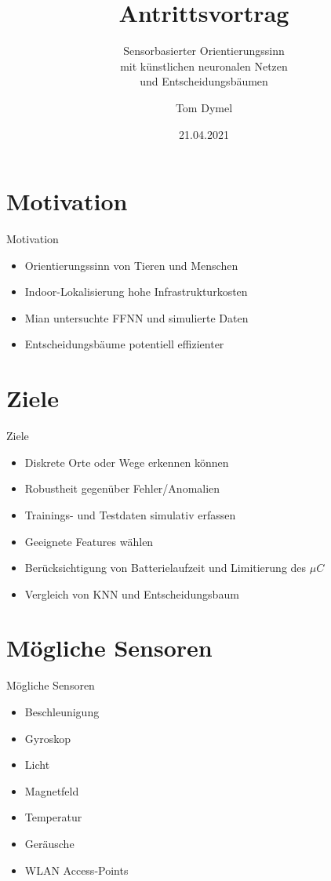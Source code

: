 \documentclass[10pt]{beamer}
\title{Antrittsvortrag}
\subtitle{Sensorbasierter Orientierungssinn\\mit künstlichen neuronalen Netzen\\und Entscheidungsbäumen}
\date{21.04.2021}
\author{Tom Dymel}
\institute{Masterarbeit\\Technische Universität Hamburg}
\begin{document}
\maketitle

\section{Motivation}
\begin{frame}{Motivation}
\begin{itemize}
    \item Orientierungssinn von Tieren und Menschen
    \item Indoor-Lokalisierung hohe Infrastrukturkosten
    \item Mian untersuchte FFNN und simulierte Daten
    \item Entscheidungsbäume potentiell effizienter
\end{itemize}
\end{frame}

\section{Ziele}
\begin{frame}{Ziele}
\begin{itemize}
    \item Diskrete Orte oder Wege erkennen können
    \item Robustheit gegenüber Fehler/Anomalien
    \item Trainings- und Testdaten simulativ erfassen
    \item Geeignete Features wählen
    \item Berücksichtigung von Batterielaufzeit und Limitierung des $\mu C$
    \item Vergleich von KNN und Entscheidungsbaum
\end{itemize}
\end{frame}

\section{Mögliche Sensoren}
\begin{frame}{Mögliche Sensoren}
\begin{itemize}
    \item Beschleunigung
    \item Gyroskop
    \item Licht
    \color{red}
    \item Magnetfeld
    \item Temperatur
    \item Geräusche
    \item WLAN Access-Points
\end{itemize}
\end{frame}
\end{document}
